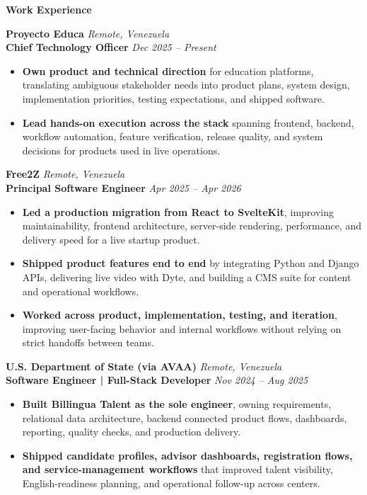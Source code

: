 \documentclass[11pt]{article}
\begin{document}
\vspace{7pt}
\begin{center}
    \textbf{Work Experience}
\end{center}
\vspace{-4pt}

\textbf{Proyecto Educa} \hfill \textit{Remote, Venezuela} \\
\textbf{Chief Technology Officer} \hfill \textit{Dec 2025 -- Present}
\begin{itemize}
    \item \textbf{Own product and technical direction} for education platforms, translating ambiguous stakeholder needs into product plans, system design, implementation priorities, testing expectations, and shipped software.
    \item \textbf{Lead hands-on execution across the stack} spanning frontend, backend, workflow automation, feature verification, release quality, and system decisions for products used in live operations.
\end{itemize}

\vspace{8pt}
\textbf{Free2Z} \hfill \textit{Remote, Venezuela} \\
\textbf{Principal Software Engineer} \hfill \textit{Apr 2025 -- Apr 2026}
\begin{itemize}
    \item \textbf{Led a production migration from React to SvelteKit}, improving maintainability, frontend architecture, server-side rendering, performance, and delivery speed for a live startup product.
    \item \textbf{Shipped product features end to end} by integrating Python and Django APIs, delivering live video with Dyte, and building a CMS suite for content and operational workflows.
    \item \textbf{Worked across product, implementation, testing, and iteration}, improving user-facing behavior and internal workflows without relying on strict handoffs between teams.
\end{itemize}

\vspace{8pt}
\textbf{U.S. Department of State (via AVAA)} \hfill \textit{Remote, Venezuela} \\
\textbf{Software Engineer | Full-Stack Developer} \hfill \textit{Nov 2024 -- Aug 2025}
\begin{itemize}
    \item \textbf{Built Billingua Talent as the sole engineer}, owning requirements, relational data architecture, backend connected product flows, dashboards, reporting, quality checks, and production delivery.
    \item \textbf{Shipped candidate profiles, advisor dashboards, registration flows, and service-management workflows} that improved talent visibility, English-readiness planning, and operational follow-up across centers.
\end{itemize}
\end{document}
